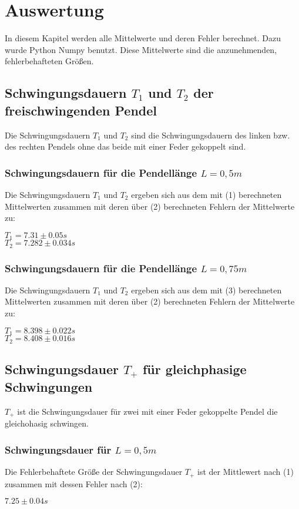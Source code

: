 \section{Auswertung}
\label{sec:Auswertung}
In diesem Kapitel werden alle Mittelwerte und deren Fehler berechnet. 
Dazu wurde Python Numpy benutzt. Diese Mittelwerte sind die anzunehmenden, fehlerbehafteten Größen.
\subsection{Schwingungsdauern $T_1$ und $T_2$ der  freischwingenden Pendel}
Die Schwingungsdauern $T_1$ und $T_2$ sind die Schwingungsdauern des linken bzw. des rechten Pendels ohne das
beide mit einer Feder gekoppelt sind.

\subsubsection{Schwingungsdauern für die Pendellänge $L=0,5m$}
Die Schwingungsdauern $T_1$ und $T_2$ ergeben sich aus dem mit (1) berechneten Mittelwerten
zusammen mit deren über (2) berechneten Fehlern der Mittelwerte zu:
\begin{center}
  $T_1=7.31\pm0.05s$\\
  $T_2=7.282\pm0.034s$
\end{center}


\subsubsection{Schwingungsdauern für die Pendellänge $L=0,75m$}
Die Schwingungsdauern $T_1$ und $T_2$ ergeben sich aus dem mit (3) berechneten Mittelwerten
zusammen mit deren über (2) berechneten Fehlern der Mittelwerte zu:
\begin{center}
  $T_1=8.398\pm0.022s$\\
  $T_2=8.408\pm0.016s$
\end{center}


\subsection{Schwingungsdauer $T_+$  für gleichphasige Schwingungen}
$T_+$ ist die Schwingungsdauer für zwei mit einer Feder gekoppelte Pendel die gleichohasig schwingen.
\subsubsection{Schwingungsdauer für $L=0,5m$}
Die Fehlerbehaftete Größe der Schwingungsdauer $T_+$ ist der Mittlewert nach (1) zusammen 
mit dessen Fehler nach (2):
\begin{center}
  $7.25\pm0.04s$
\end{center}
